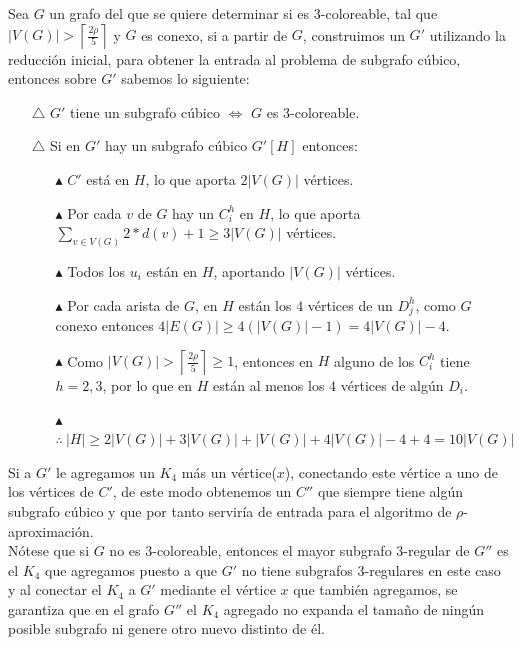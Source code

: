\documentclass{article}
\begin{document}
Sea $G$ un grafo del que se quiere determinar si es $3$-coloreable, tal que $|V(G)| >  \left\lceil\frac{2\rho}{5} \right\rceil $ y $G$ es conexo, si a partir de $G$, construimos un $G'$ utilizando la 
reducci\'on inicial, para obtener la entrada al problema de subgrafo c\'ubico, entonces sobre $G'$ sabemos lo siguiente: 

\begin{itemize}
    \item[$\triangle $] $G'$ tiene un subgrafo c\'ubico $\Leftrightarrow $ $G$ es $3$-coloreable.
    \item[$\triangle $] Si en $G'$ hay un subgrafo c\'ubico $G'[H]$ entonces: 
    \begin{itemize}
        \item[$\blacktriangle $] $C'$ est\'a en $H$, lo que aporta $2|V(G)|$ v\'ertices.
        \item[$\blacktriangle $] Por cada $v$ de $G$ hay un $C_i^h$ en $H$, lo que aporta $\sum_{v \in V(G)} 2*d(v) + 1 \geq 3|V(G)|$ v\'ertices.
        \item[$\blacktriangle $] Todos los $u_i$ est\'an en $H$, aportando $|V(G)|$ v\'ertices.
        \item[$\blacktriangle $] Por cada arista de $G$, en $H$ est\'an los $4$ v\'ertices de un $D_j^h$, como $G$ conexo entonces $4|E(G)| \geq 4(|V(G)| - 1) = 4|V(G)|-4$.
        \item[$\blacktriangle $] Como $|V(G)| > \left\lceil \frac{2 \rho}{5} \right\rceil \geq 1 $, entonces en $H$ alguno de los $C_i^h$ tiene $h =2,3$, por lo que en $H$ est\'an al menos los $4$ v\'ertices de alg\'un $D_i$.
        \item[$\blacktriangle $] $\therefore~ |H| \geq 2|V(G)| + 3|V(G)| + |V(G)| + 4|V(G)|-4 +4 = 10|V(G)|$
    \end{itemize}
\end{itemize}
Si a $G'$ le agregamos un $K_4$ m\'as un v\'ertice($x$), conectando este v\'ertice a uno de los v\'ertices de $C'$, de este modo obtenemos un $C''$ que siempre tiene alg\'un subgrafo c\'ubico y que por tanto 
servir\'ia de entrada para el algoritmo de $\rho$-aproximaci\'on. \\

N\'otese que si $G$ no es $3$-coloreable, entonces el mayor subgrafo $3$-regular de $G''$ es el $K_4$ que agregamos puesto a que $G'$ no tiene 
subgrafos $3$-regulares en este caso y al conectar el $K_4$ a $G'$ mediante el v\'ertice $x$ que tambi\'en agregamos, se garantiza que en el grafo $G''$ el $K_4$
agregado no expanda el tama\~no de ning\'un posible subgrafo ni genere otro nuevo distinto de \'el.\\ 
\end{document}
